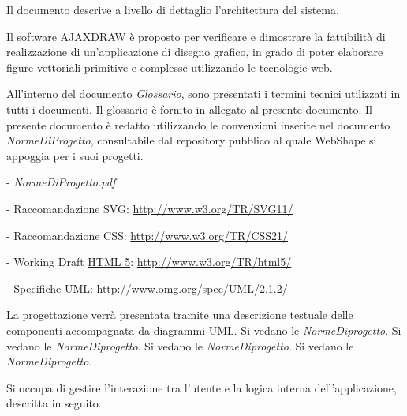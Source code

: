 

Il documento descrive a livello di dettaglio l'architettura del sistema.

Il software AJAXDRAW \`e proposto per verificare e dimostrare la fattibilit\`a di realizzazione di un'applicazione di disegno grafico, in grado di poter elaborare figure vettoriali primitive e complesse utilizzando le tecnologie web.

All'interno del documento \textit{Glossario}, sono presentati i termini tecnici utilizzati in tutti i documenti. Il glossario \`e fornito in allegato al presente documento.
Il presente documento \`e redatto utilizzando le convenzioni inserite nel documento \textit{NormeDiProgetto}, consultabile dal repository pubblico al quale WebShape si appoggia per i suoi progetti.
\begin{elencopuntato}[\subsubsecindent]
\item[-] \textit{NormeDiProgetto.pdf}
\item[-] Raccomandazione SVG: \href{http://www.w3.org/TR/SVG11/}{http://www.w3.org/TR/SVG11/}
\item[-] Raccomandazione CSS: \href{http://www.w3.org/TR/CSS21/}{http://www.w3.org/TR/CSS21/}
\item[-] Working Draft \underline{HTML 5}: \href{http://www.w3.org/TR/html5/}{http://www.w3.org/TR/html5/}
\item[-] Specifiche UML: \href{http://www.omg.org/spec/UML/2.1.2/}{http://www.omg.org/spec/UML/2.1.2/}
\end{elencopuntato}

La progettazione verr\`a presentata tramite una descrizione testuale delle componenti accompagnata da diagrammi UML.
Si vedano le \textit{NormeDiprogetto}.
Si vedano le \textit{NormeDiprogetto}.
Si vedano le \textit{NormeDiprogetto}.
Si vedano le \textit{NormeDiprogetto}.

Si occupa di gestire l'interazione tra l'utente e la logica interna dell'applicazione, descritta in seguito.


